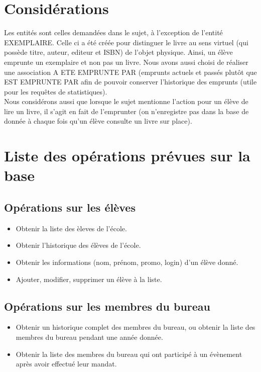 \documentclass[a4paper, 11pt]{article}
\begin{document}
\section{Considérations}
Les entités sont celles demandées dans le sujet, à l'exception de l'entité EXEMPLAIRE. Celle ci a été créée pour distinguer le livre au sens virtuel (qui possède titre, auteur, editeur et ISBN) de l'objet physique. Ainsi, un élève emprunte un exemplaire et non pas un livre. Nous avons aussi choisi de réaliser une association A ETE EMPRUNTE PAR (emprunts actuels et passés plut\^ot que EST EMPRUNTE PAR afin de pouvoir conserver l'historique des emprunts (utile pour les requ\^etes de statistiques).\\
Nous considérons aussi que lorsque le sujet mentionne l'action pour un élève de lire un livre, il s'agit en fait de l'emprunter (on n'enregistre pas dans la base de donnée à chaque fois qu'un élève consulte un livre sur place). 

\section{Liste des opérations prévues sur la base}

\subsection{Opérations sur les élèves}
\begin{itemize}
\item Obtenir la liste des èleves de l'école.
\item Obtenir l'historique des élèves de l'école.
\item Obtenir les informations (nom, prénom, promo, login) d'un élève donné.
\item Ajouter, modifier, supprimer un élève à la liste.
\end{itemize}
\subsection{Opérations sur les membres du bureau}
\begin{itemize}
\item Obtenir un historique complet des membres du bureau, ou obtenir la liste des membres du bureau pendant une année donnée.
\item Obtenir la liste des membres du bureau qui ont participé à un évènement après avoir effectué leur mandat.
\end{itemize}
\end{document}
